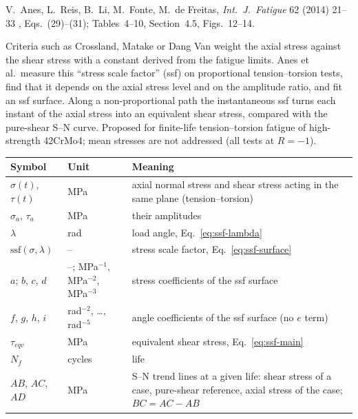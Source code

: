 \label{sheet:SSF}

 V.~Anes, L.~Reis, B.~Li, M.~Fonte, M.~de Freitas, \emph{Int.\ J.\ Fatigue} 62 (2014)
21--33 \cite{anes2014}, Eqs.~(29)--(31); Tables~4--10, Section~4.5, Figs.~12--14.

 Criteria such as Crossland, Matake or Dang Van weight the axial stress against
the shear stress with a constant derived from the fatigue limits. Anes et al.\ measure this ``stress
scale factor'' (ssf) on proportional tension--torsion tests, find that it depends on the axial stress
level and on the amplitude ratio, and fit an ssf surface. Along a non-proportional path the
instantaneous ssf turns each instant of the axial stress into an equivalent shear stress, compared
with the pure-shear S--N curve. Proposed for finite-life tension--torsion fatigue of high-strength
42CrMo4; mean stresses are not addressed (all tests at $R=-1$).

\begin{center}\small
\begin{tabular}{@{}llp{100mm}@{}}
\toprule
Symbol & Unit & Meaning\\\midrule
$\sigma(t)$, $\tau(t)$ & MPa & axial normal stress and shear stress acting in the same plane (tension--torsion)\\
$\sigma_a$, $\tau_a$ & MPa & their amplitudes\\
$\lambda$ & rad & load angle, Eq.~\eqref{eq:ssf-lambda}\\
$\mathrm{ssf}(\sigma,\lambda)$ & -- & stress scale factor, Eq.~\eqref{eq:ssf-surface}\\
$a$; $b$, $c$, $d$ & --; MPa$^{-1}$, MPa$^{-2}$, MPa$^{-3}$ & stress coefficients of the ssf surface\\
$f$, $g$, $h$, $i$ & rad$^{-2}$, \dots, rad$^{-5}$ & angle coefficients of the ssf surface (no $e$ term)\\
$\tau_{eqv}$ & MPa & equivalent shear stress, Eq.~\eqref{eq:ssf-main}\\
$N_f$ & cycles & life\\
$AB$, $AC$, $AD$ & MPa & S--N trend lines at a given life: shear stress of a case, pure-shear reference, axial stress of the case; $BC=AC-AB$\\
\bottomrule
\end{tabular}
\end{center}

